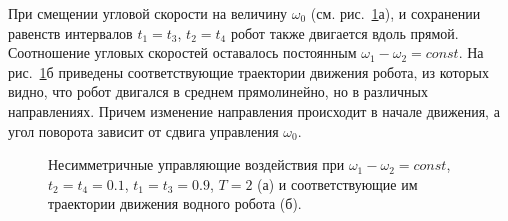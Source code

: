 При смещении угловой скорости на величину $\omega_0$ (см. рис.~\ref{DifferentAmp}а), и сохранении равенств интервалов $t_1=t_3$, $t_2=t_4$  робот также двигается вдоль прямой.  Соотношение угловых скоростей оставалось постоянным $ \omega_1 - \omega_2 = const$.  На рис.~\ref{DifferentAmp}б приведены соответствующие траектории движения робота, из которых видно, что робот двигался в среднем прямолинейно, но в различных направлениях. Причем изменение направления происходит в начале движения, а угол поворота зависит от сдвига управления $\omega_0$. 

\begin{figure}[!ht]
	\begin{minipage}[h]{0.5\linewidth}
	\end{minipage}
	\hfill
	\begin{minipage}[h]{0.5\linewidth}
	\end{minipage}
	\caption{Несимметричные управляющие воздействия при $\omega_1 - \omega_2 = const$, $t_2 = t_4 = 0.1$, $t_1 = t_3 = 0.9$, $T = 2$ (а) и соответствующие им траектории движения водного робота (б).}
	\label{DifferentAmp}
\end{figure}

%	
%	

